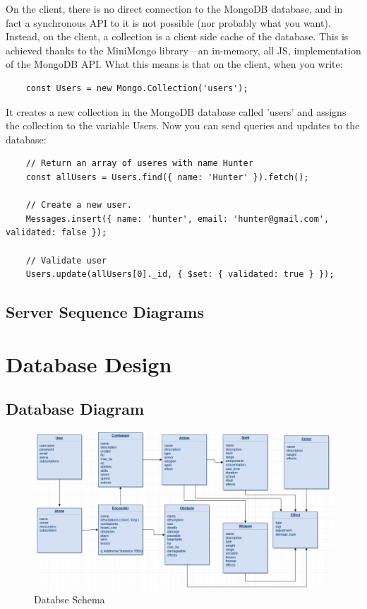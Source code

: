 \documentclass[12pt,a4paper]{report}
\begin{document}
	
	
	On the client, there is no direct connection to the MongoDB database, and in fact a synchronous API to it is not possible (nor probably what you want). Instead, on the client, a collection is a client side cache of the database. This is achieved thanks to the MiniMongo library—an in-memory, all JS, implementation of the MongoDB API. What this means is that on the client, when you write:
	
	\begin{lstlisting}
	const Users = new Mongo.Collection('users');
	\end{lstlisting}
	
	It creates a new collection in the MongoDB database called 'users' and assigns the collection to the variable Users. Now you can send queries and updates to the database:
	
	\begin{lstlisting}
	// Return an array of useres with name Hunter
	const allUsers = Users.find({ name: 'Hunter' }).fetch();
	
	// Create a new user.
	Messages.insert({ name: 'hunter', email: 'hunter@gmail.com', validated: false });
	
	// Validate user
	Users.update(allUsers[0]._id, { $set: { validated: true } });
	\end{lstlisting}
	
	
	
	

	
	\subsection{Server Sequence Diagrams}
	
	\newpage
	\section{Database Design}
	\subsection {Database Diagram}
	\begin{figure}[h]
		\centering
		\includegraphics[scale=.4]{database_schema}
		\caption{Databse Schema}
		\label{fig: Databse Schema }
	\end{figure}
\end{document}
